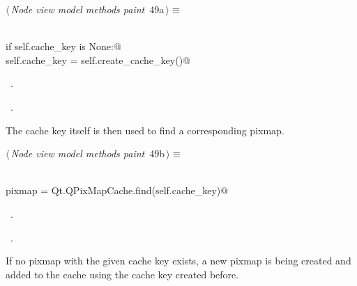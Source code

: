 \documentclass[
    a4paper,      %
    10pt,         %
    openright,    %
    notitlepage,  %
    parskip=half, %
]{scrreprt}       %
\theoremstyle{definition}                    %
\begin{document}
\begin{flushleft} \small
\begin{minipage}{\linewidth}\label{scrap69}\raggedright\small
{} $\langle\,${\itshape Node view model methods paint}\nobreak\ {\footnotesize {49a}}$\,\rangle\equiv$
\vspace{-1exm}
\begin{list}{}{} \item
\mbox{}\lstinline@@\\
\mbox{}\lstinline@    if self.cache_key is None:@\\
\mbox{}\lstinline@        self.cache_key = self.create_cache_key()@\\
\mbox{}\lstinline@@{\NWsep}
\end{list}
\vspace{-1.5ex}
\footnotesize
\begin{list}{}{\setlength{\itemsep}{-\parsep}\setlength{\itemindent}{-\leftmargin}}
\item \NWtxtMacroDefBy\ .
\item \NWtxtMacroRefIn\ .

\item{}
\end{list}
\end{minipage}\vspace{4ex}
\end{flushleft}
The cache key itself is then used to find a corresponding pixmap.

\begin{flushleft} \small
\begin{minipage}{\linewidth}\label{scrap70}\raggedright\small
{} $\langle\,${\itshape Node view model methods paint}\nobreak\ {\footnotesize {49b}}$\,\rangle\equiv$
\vspace{-1exm}
\begin{list}{}{} \item
\mbox{}\lstinline@@\\
\mbox{}\lstinline@    pixmap = Qt.QPixMapCache.find(self.cache_key)@\\
\mbox{}\lstinline@@{\NWsep}
\end{list}
\vspace{-1.5ex}
\footnotesize
\begin{list}{}{\setlength{\itemsep}{-\parsep}\setlength{\itemindent}{-\leftmargin}}
\item \NWtxtMacroDefBy\ .
\item \NWtxtMacroRefIn\ .

\item{}
\end{list}
\end{minipage}\vspace{4ex}
\end{flushleft}
If no pixmap with the given cache key exists, a new pixmap is being created and
added to the cache using the cache key created before.
\end{document}
